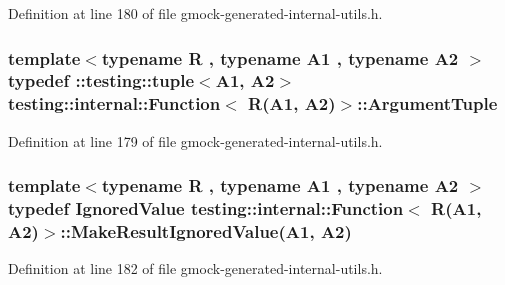 Definition at line 180 of file gmock-\/generated-\/internal-\/utils.\+h.

\subsubsection[{\texorpdfstring{Argument\+Tuple}{ArgumentTuple}}]{\setlength{\rightskip}{0pt plus 5cm}template$<$typename R , typename A1 , typename A2 $>$ typedef \+::testing\+::tuple$<$A1, A2$>$ {\bf testing\+::internal\+::\+Function}$<$ {\bf R}(A1, A2)$>$\+::{\bf Argument\+Tuple}}\hypertarget{structtesting_1_1internal_1_1_function_3_01_r_07_a1_00_01_a2_08_4_a2de00437877c29ec6cb78396928b8e3e}{}\label{structtesting_1_1internal_1_1_function_3_01_r_07_a1_00_01_a2_08_4_a2de00437877c29ec6cb78396928b8e3e}


Definition at line 179 of file gmock-\/generated-\/internal-\/utils.\+h.

\subsubsection[{\texorpdfstring{Make\+Result\+Ignored\+Value}{MakeResultIgnoredValue}}]{\setlength{\rightskip}{0pt plus 5cm}template$<$typename R , typename A1 , typename A2 $>$ typedef {\bf Ignored\+Value} {\bf testing\+::internal\+::\+Function}$<$ {\bf R}(A1, A2)$>$\+::Make\+Result\+Ignored\+Value(A1, A2)}\hypertarget{structtesting_1_1internal_1_1_function_3_01_r_07_a1_00_01_a2_08_4_a89033ea870fe831b13899ce36666e102}{}\label{structtesting_1_1internal_1_1_function_3_01_r_07_a1_00_01_a2_08_4_a89033ea870fe831b13899ce36666e102}


Definition at line 182 of file gmock-\/generated-\/internal-\/utils.\+h.

